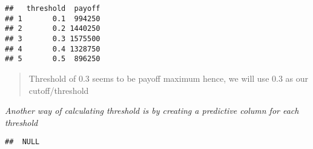 \documentclass[
]{article}
\newenvironment{Shaded}{\begin{snugshade}}{\end{snugshade}}
\newcommand{\FloatTok}[1]{\textcolor[rgb]{0.00,0.00,0.81}{#1}}
\newcommand{\KeywordTok}[1]{\textcolor[rgb]{0.13,0.29,0.53}{\textbf{#1}}}
\newcommand{\NormalTok}[1]{#1}
\newcommand{\OperatorTok}[1]{\textcolor[rgb]{0.81,0.36,0.00}{\textbf{#1}}}
\begin{document}
\begin{verbatim}
##   threshold  payoff
## 1       0.1  994250
## 2       0.2 1440250
## 3       0.3 1575500
## 4       0.4 1328750
## 5       0.5  896250
\end{verbatim}

\begin{quote}
Threshold of 0.3 seems to be payoff maximum hence, we will use 0.3 as
our cutoff/threshold
\end{quote}

\emph{Another way of calculating threshold is by creating a predictive
column for each threshold}

\begin{Shaded}
\end{Shaded}

\begin{verbatim}
##  NULL
\end{verbatim}
\end{document}
